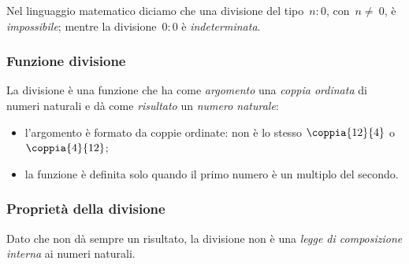 Nel linguaggio matematico diciamo che una divisione del tipo~\(n:0\), 
con~\(n\neq~0\), è \emph{impossibile}; mentre la divisione~\(0:0\) è 
\emph{indeterminata}.

\subsubsection{Funzione divisione}

La divisione è una funzione che ha come \emph{argomento} una \emph{coppia 
ordinata} di numeri naturali e dà come \emph{risultato} un \emph{numero 
naturale}:

\vspace{2em}
\begin{minipage}[t]{.48\textwidth}
\begin{center}
\begin{inaccessibleblock}
\end{inaccessibleblock}
\end{center}
\end{minipage}
\hfill
\begin{minipage}[t]{.48\textwidth}
\begin{center}
\begin{inaccessibleblock}
\end{inaccessibleblock}
\end{center}
\end{minipage}

\vspace{-1em}
\begin{osservazione}
\begin{itemize} [nosep]
\item l'argomento è formato da coppie ordinate: non è lo stesso 
\(\coppia{12}{4}\) o \(\coppia{4}{12}\);
\item la funzione è definita solo quando il primo numero è un multiplo
del secondo.
\end{itemize}

\end{osservazione}

\subsubsection{Proprietà della divisione}

Dato che non dà sempre un risultato, la divisione non è una 
\emph{legge di composizione interna} ai numeri naturali. 


